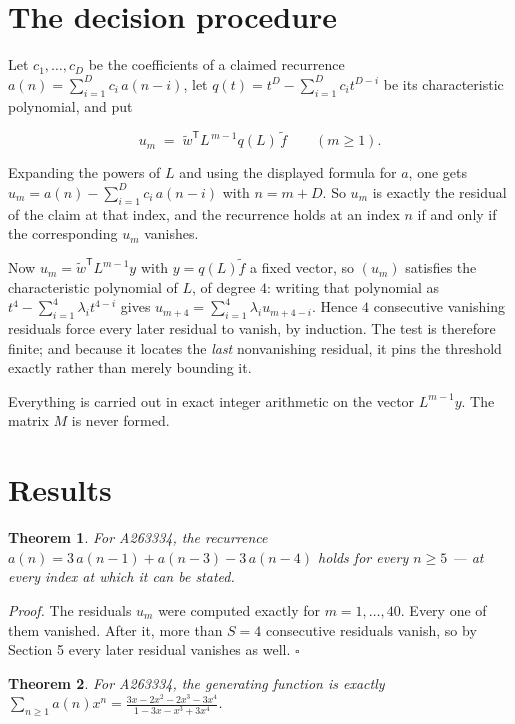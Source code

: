 \documentclass[11pt]{article}
\newtheorem{theorem}{Theorem}
\theoremstyle{definition}
\begin{document}
\section{The decision procedure}

Let $c_1,\dots,c_D$ be the coefficients of a claimed recurrence $a(n) = \sum_{i=1}^{D} c_i\,a(n-i)$, let $q(t) = t^{D} - \sum_{i=1}^{D} c_i t^{D-i}$ be its characteristic polynomial, and put

\[u_m \;=\; \tilde w^{\mathsf T} L^{\,m-1} q(L)\,\tilde f \qquad (m \ge 1).\]

Expanding the powers of $L$ and using the displayed formula for $a$, one gets $u_m = a(n) - \sum_{i=1}^{D} c_i\,a(n-i)$ with $n = m + D$. So $u_m$ is exactly the residual of the claim at that index, and the recurrence holds at an index $n$ if and only if the corresponding $u_m$ vanishes.

Now $u_m = \tilde w^{\mathsf T} L^{m-1} y$ with $y = q(L)\tilde f$ a fixed vector, so $(u_m)$ satisfies the characteristic polynomial of $L$, of degree $4$: writing that polynomial as $t^{4} - \sum_{i=1}^{4} \lambda_i t^{4-i}$ gives $u_{m+4} = \sum_{i=1}^{4} \lambda_i u_{m+4-i}$. Hence $4$ consecutive vanishing residuals force every later residual to vanish, by induction. The test is therefore finite; and because it locates the {\itshape last} nonvanishing residual, it pins the threshold exactly rather than merely bounding it.

Everything is carried out in exact integer arithmetic on the vector $L^{m-1}y$. The matrix $M$ is never formed.

\section{Results}

\begin{theorem} For A263334, the recurrence $a(n) = 3\,a(n-1) + a(n-3) - 3\,a(n-4)$ holds for every $n \ge 5$ --- at every index at which it can be stated.\end{theorem}

{\itshape Proof.} The residuals $u_m$ were computed exactly for $m = 1,\dots,40$. Every one of them vanished. After it, more than $S = 4$ consecutive residuals vanish, so by Section 5 every later residual vanishes as well. $\square$

\begin{theorem} For A263334, the generating function is exactly $\sum_{n\ge 1} a(n)x^n = \frac{3x - 2x^{2} - 2x^{3} - 3x^{4}}{1 - 3x - x^{3} + 3x^{4}}$.\end{theorem}
\end{document}

